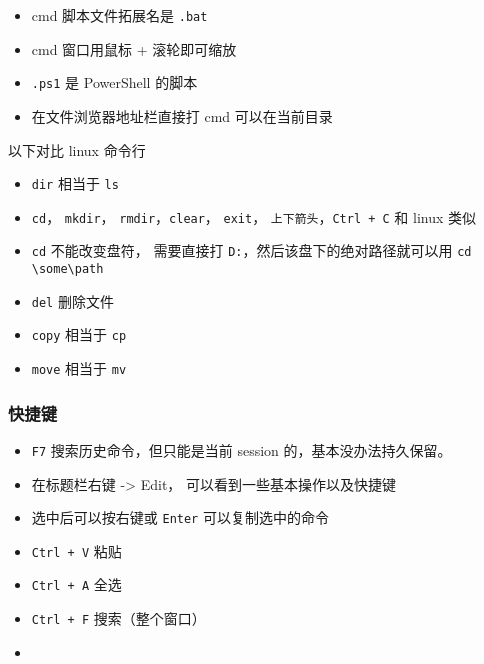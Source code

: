
\begin{issues}
\issueDraft
\end{issues}

\begin{itemize}
\item cmd 脚本文件拓展名是 \verb`.bat`
\item cmd 窗口用鼠标 + 滚轮即可缩放
\item \verb`.ps1` 是 PowerShell 的脚本
\item 在文件浏览器地址栏直接打 cmd 可以在当前目录
\end{itemize}

以下对比 linux 命令行
\begin{itemize}
\item \verb`dir` 相当于 \verb`ls`
\item \verb`cd`， \verb`mkdir`， \verb`rmdir`，\verb`clear`， \verb`exit`， \verb`上下箭头`，\verb`Ctrl + C` 和 linux 类似
\item \verb`cd` 不能改变盘符， 需要直接打 \verb`D:`，然后该盘下的绝对路径就可以用 \verb`cd \some\path`
\item \verb`del` 删除文件
\item \verb`copy` 相当于 \verb`cp`
\item \verb`move` 相当于 \verb`mv`
\end{itemize}

\subsubsection{快捷键}
\begin{itemize}
\item \verb`F7` 搜索历史命令，但只能是当前 session 的，基本没办法持久保留。
\item 在标题栏右键 -> Edit， 可以看到一些基本操作以及快捷键
\item 选中后可以按右键或 \verb`Enter` 可以复制选中的命令
\item \verb`Ctrl + V` 粘贴
\item \verb`Ctrl + A` 全选
\item \verb`Ctrl + F` 搜索（整个窗口）
\item 
\end{itemize}
